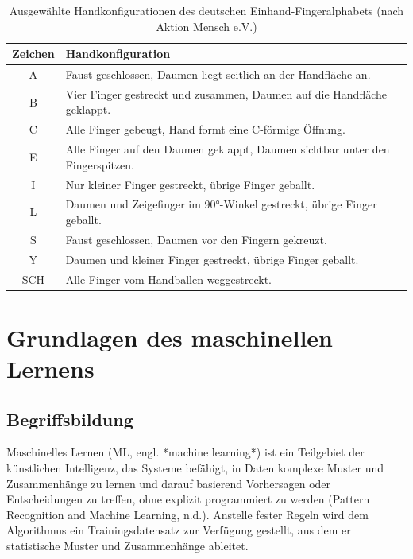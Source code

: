 \begin{table}[htbp]
    \centering
    \caption{Ausgewählte Handkonfigurationen des deutschen Einhand-Fingeralphabets (nach Aktion Mensch e.V.)}
    \label{tab:fingeralphabet-konfigurationen}
    \begin{tabular}{|c|p{}|}
        \hline
        \textbf{Zeichen} & \textbf{Handkonfiguration} \\
        \hline
        A & Faust geschlossen, Daumen liegt seitlich an der Handfläche an. \\
        \hline
        B & Vier Finger gestreckt und zusammen, Daumen auf die Handfläche geklappt. \\
        \hline
        C & Alle Finger gebeugt, Hand formt eine C-förmige Öffnung. \\
        \hline
        E & Alle Finger auf den Daumen geklappt, Daumen sichtbar unter den Fingerspitzen. \\
        \hline
        I & Nur kleiner Finger gestreckt, übrige Finger geballt. \\
        \hline
        L & Daumen und Zeigefinger im 90°-Winkel gestreckt, übrige Finger geballt. \\
        \hline
        S & Faust geschlossen, Daumen vor den Fingern gekreuzt. \\
        \hline
        Y & Daumen und kleiner Finger gestreckt, übrige Finger geballt. \\
        \hline
        SCH & Alle Finger vom Handballen weggestreckt. \\
        \hline
    \end{tabular}
\end{table}


\section{Grundlagen des maschinellen Lernens}
\subsection{Begriffsbildung}

Maschinelles Lernen (ML, engl. *machine learning*) ist ein Teilgebiet der künstlichen Intelligenz, das Systeme befähigt, in Daten komplexe Muster und Zusammenhänge zu lernen und darauf basierend Vorhersagen oder Entscheidungen zu treffen, ohne explizit programmiert zu werden (Pattern Recognition and Machine Learning, n.d.). Anstelle fester Regeln wird dem Algorithmus ein Trainingsdatensatz zur Verfügung gestellt, aus dem er statistische Muster und Zusammenhänge ableitet.

